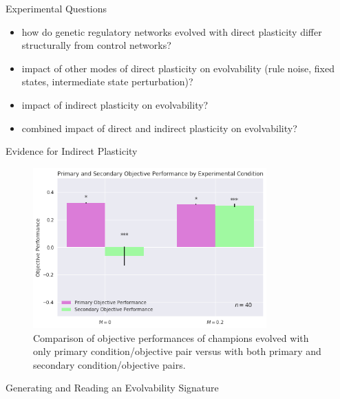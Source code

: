 \begin{frame}{Experimental Questions}
\begin{itemize}
\item how do genetic regulatory networks evolved with direct plasticity differ structurally from control networks? \cite{Reisinger2007AcquiringRepresentations}
\item impact of other modes of direct plasticity on evolvability (rule noise, fixed states, intermediate state perturbation)?
\item impact of indirect plasticity on evolvability?   
\item combined impact of direct and indirect plasticity on evolvability?   
\end{itemize}
\end{frame}


\begin{frame}{Evidence for Indirect Plasticity}
\begin{figure}
    \centering
    \includegraphics[width=0.8\textwidth]{img/primary_secondary_performance}
 	\captionsetup{singlelinecheck=off,justification=raggedright}
  	\caption{Comparison of objective performances of champions evolved with only primary condition/objective pair versus with both primary and secondary condition/objective pairs.}
    \label{fig:ev_w0}
\end{figure}
\end{frame}

\begin{frame}{Generating and Reading an Evolvability Signature}
  
\end{frame}

